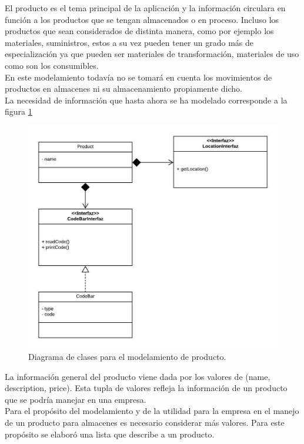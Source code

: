El producto es el tema principal de la aplicación y la información circulara en función a los productos que se tengan almacenados o en proceso. Incluso los productos que sean considerados de distinta manera, como por ejemplo los materiales, suministros, estos a su vez pueden tener un grado más de especialización ya que pueden ser materiales de transformación, materiales de uso como son los consumibles.\\

En este modelamiento todavía no se tomará en cuenta los movimientos de productos en almacenes ni su almacenamiento propiamente dicho.\\

La necesidad de información que hasta ahora se ha modelado corresponde a la figura \ref{Product-classes}

\begin{figure}
  \centering
    \includegraphics[scale=0.9]{./Capitulo3/figs/ADDStock-Product.jpeg}
  \caption{Diagrama de clases para el modelamiento de producto.}
  \label{Product-classes}
\end{figure}

La información general del producto viene dada por los valores de (name, description, price). Esta tupla de valores refleja la información de un producto que se podría manejar en una empresa.\\

Para el propósito del modelamiento y de la utilidad para la empresa en el manejo de un producto para almacenes es necesario considerar más valores. Para este propósito se elaboró una lista que describe a un producto.

